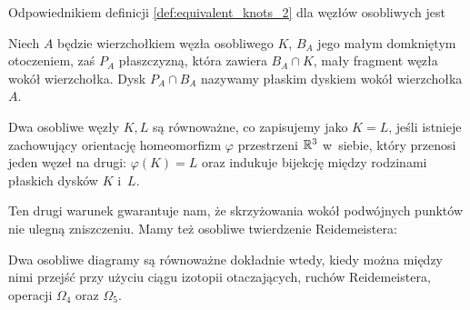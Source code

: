 Odpowiednikiem definicji \ref{def:equivalent_knots_2} dla węzłów osobliwych jest

\begin{definition}
    Niech $A$ będzie wierzchołkiem węzła osobliwego $K$, $B_A$ jego małym domkniętym otoczeniem, zaś $P_A$ płaszczyzną, która zawiera $B_A \cap K$, mały fragment węzła wokół wierzchołka.
    Dysk $P_A \cap B_A$ nazywamy płaskim dyskiem wokół wierzchołka $A$.
\end{definition}

\begin{definition}
    Dwa osobliwe węzły $K, L$ są równoważne, co zapisujemy jako $K = L$, jeśli istnieje zachowujący orientację homeomorfizm $\varphi$ przestrzeni $\mathbb R^3$ w~siebie, który przenosi jeden węzeł na drugi: $\varphi(K) = L$ oraz indukuje bijekcję między rodzinami płaskich dysków $K$ i~$L$.
\end{definition}

Ten drugi warunek gwarantuje nam, że skrzyżowania wokół podwójnych punktów nie ulegną zniszczeniu.
Mamy też osobliwe twierdzenie Reidemeistera:

\begin{proposition}
%
%
%
    Dwa osobliwe diagramy są równoważne dokładnie wtedy, kiedy można między nimi przejść przy użyciu ciągu izotopii otaczających, ruchów Reidemeistera, operacji $\Omega_4$ oraz $\Omega_5$.

\end{proposition}

